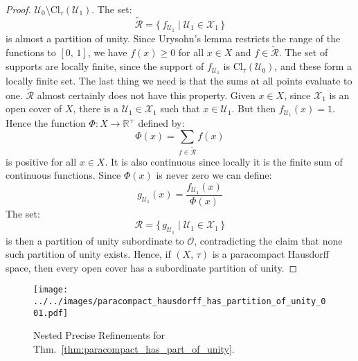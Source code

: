 \documentclass{article}
\theoremstyle{plain}
\theoremstyle{normal}
\begin{document}
\begin{proof}
            $\mathcal{U}_{0}\setminus\textrm{Cl}_{\tau}(\mathcal{U}_{1})$. The
            set:
            \begin{equation}
                \tilde{\mathcal{R}}=
                \{\,f_{\mathcal{U}_{1}}\;|\;
                    \mathcal{U}_{1}\in\mathcal{X}_{1}\,\}
            \end{equation}
            is almost a partition of unity. Since Urysohn's lemma restricts the
            range of the functions to $[0,\,1]$, we have $f(x)\geq{0}$ for all
            $x\in{X}$ and $f\in\tilde{\mathcal{R}}$. The set of supports are
            locally finite, since the support of
            $f_{\mathcal{U}_{1}}$ is $\textrm{Cl}_{\tau}(\mathcal{U}_{0})$,
            and these form a locally finite set. The last thing we need is
            that the sums at all points evaluate to one. $\tilde{\mathcal{R}}$
            almost certainly does not have this property. Given $x\in{X}$, since
            $\mathcal{X}_{1}$ is an open cover of $X$, there is a
            $\mathcal{U}_{1}\in\mathcal{X}_{1}$ such that $x\in\mathcal{U}_{1}$.
            But then $f_{\mathcal{U}_{1}}(x)=1$. Hence the function
            $\Phi:X\rightarrow\mathbb{R}^{+}$ defined by:
            \begin{equation}
                \Phi(x)=\sum_{f\in\tilde{\mathcal{R}}}f(x)
            \end{equation}
            is positive for all $x\in{X}$. It is also continuous since locally
            it is the finite sum of continuous functions. Since $\Phi(x)$ is
            never zero we can define:
            \begin{equation}
                g_{\mathcal{U}_{1}}(x)
                =\frac{f_{\mathcal{U}_{1}}(x)}{\Phi(x)}
            \end{equation}
            The set:
            \begin{equation}
                \mathcal{R}
                =\{\,g_{\mathcal{U}_{1}}\;|\;
                    \mathcal{U}_{1}\in\mathcal{X}_{1}\,\}
            \end{equation}
            is then a partition of unity subordinate to $\mathcal{O}$,
            contradicting the claim that none such partition of unity exists.
            Hence, if $(X,\,\tau)$ is a paracompact Hausdorff space, then
            every open cover has a subordinate partition of unity.
        \end{proof}
        \begin{figure}
            \centering
            \texttt{[image: ../../images/paracompact\_hausdorff\_has\_partition\_of\_unity\_001.pdf]}
            \caption{Nested Precise Refinements for Thm.~\ref{thm:paracompact_has_part_of_unity}.}
            \label{fig:paracompact_has_part_of_unity}
        \end{figure}
\end{document}

